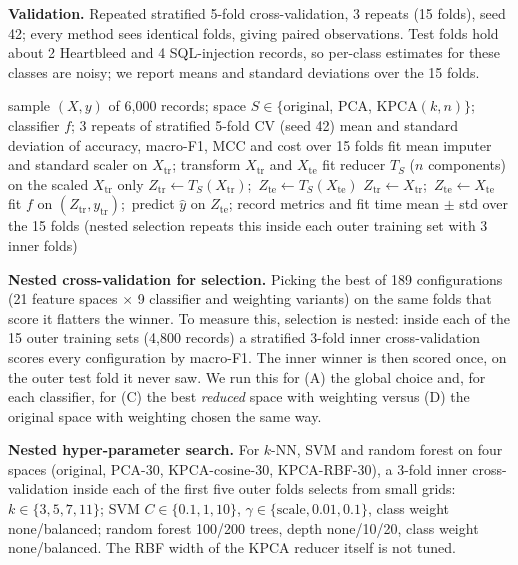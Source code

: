 \documentclass[runningheads]{llncs}
\begin{document}
\textbf{Validation.} Repeated stratified 5-fold cross-validation, 3 repeats (15 folds), seed 42; every method sees identical folds, giving paired observations. Test folds hold about 2 Heartbleed and 4 SQL-injection records, so per-class estimates for these classes are noisy; we report means and standard deviations over the 15 folds.

\begin{algorithm}[!t]
\caption{Fold-wise evaluation of one feature space $S$ and classifier $f$}\label{alg:cv}
\begin{algorithmic}[1]
\Require sample $(X,y)$ of 6,000 records; space $S\in\{$original, PCA, KPCA$(k,n)\}$; classifier $f$; 3 repeats of stratified 5-fold CV (seed 42)
\Ensure mean and standard deviation of accuracy, macro-F1, MCC and cost over 15 folds
  \State fit mean imputer and standard scaler on $X_{\mathrm{tr}}$; transform $X_{\mathrm{tr}}$ and $X_{\mathrm{te}}$
    \State fit reducer $T_S$ ($n$ components) on the scaled $X_{\mathrm{tr}}$ only
    \State $Z_{\mathrm{tr}}\gets T_S(X_{\mathrm{tr}})$;\ $Z_{\mathrm{te}}\gets T_S(X_{\mathrm{te}})$
  \Else
    \State $Z_{\mathrm{tr}}\gets X_{\mathrm{tr}}$;\ $Z_{\mathrm{te}}\gets X_{\mathrm{te}}$
  \EndIf
  \State fit $f$ on $(Z_{\mathrm{tr}},y_{\mathrm{tr}})$;\ predict $\hat{y}$ on $Z_{\mathrm{te}}$; record metrics and fit time
\EndFor
\State \Return mean $\pm$ std over the 15 folds (nested selection repeats this inside each outer training set with 3 inner folds)
\end{algorithmic}
\end{algorithm}

\textbf{Nested cross-validation for selection.} Picking the best of 189 configurations (21 feature spaces $\times$ 9 classifier and weighting variants) on the same folds that score it flatters the winner. To measure this, selection is nested: inside each of the 15 outer training sets (4{,}800 records) a stratified 3-fold inner cross-validation scores every configuration by macro-F1. The inner winner is then scored once, on the outer test fold it never saw. We run this for (A) the global choice and, for each classifier, for (C) the best \emph{reduced} space with weighting versus (D) the original space with weighting chosen the same way.

\textbf{Nested hyper-parameter search.} For $k$-NN, SVM and random forest on four spaces (original, PCA-30, KPCA-cosine-30, KPCA-RBF-30), a 3-fold inner cross-validation inside each of the first five outer folds selects from small grids: $k\in\{3,5,7,11\}$; SVM $C\in\{0.1,1,10\}$, $\gamma\in\{\text{scale},0.01,0.1\}$, class weight none/balanced; random forest 100/200 trees, depth none/10/20, class weight none/balanced. The RBF width of the KPCA reducer itself is not tuned.
\end{document}
